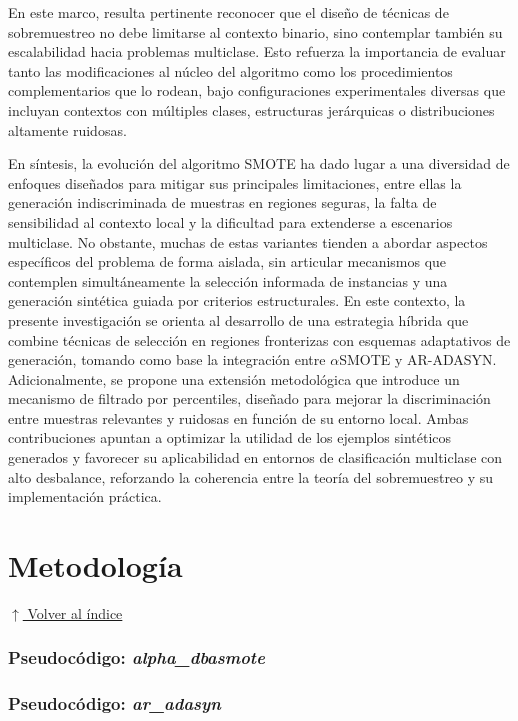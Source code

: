 \documentclass[12pt,a4paper]{article}
\begin{document}
En este marco, resulta pertinente reconocer que el diseño de técnicas de sobremuestreo no debe limitarse al contexto binario, sino contemplar también su escalabilidad hacia problemas multiclase. Esto refuerza la importancia de evaluar tanto las modificaciones al núcleo del algoritmo como los procedimientos complementarios que lo rodean, bajo configuraciones experimentales diversas que incluyan contextos con múltiples clases, estructuras jerárquicas o distribuciones altamente ruidosas.

En síntesis, la evolución del algoritmo SMOTE ha dado lugar a una diversidad de enfoques diseñados para mitigar sus principales limitaciones, entre ellas la generación indiscriminada de muestras en regiones seguras, la falta de sensibilidad al contexto local y la dificultad para extenderse a escenarios multiclase. No obstante, muchas de estas variantes tienden a abordar aspectos específicos del problema de forma aislada, sin articular mecanismos que contemplen simultáneamente la selección informada de instancias y una generación sintética guiada por criterios estructurales. En este contexto, la presente investigación se orienta al desarrollo de una estrategia híbrida que combine técnicas de selección en regiones fronterizas con esquemas adaptativos de generación, tomando como base la integración entre $ \alpha $SMOTE y AR-ADASYN. Adicionalmente, se propone una extensión metodológica que introduce un mecanismo de filtrado por percentiles, diseñado para mejorar la discriminación entre muestras relevantes y ruidosas en función de su entorno local. Ambas contribuciones apuntan a optimizar la utilidad de los ejemplos sintéticos generados y favorecer su aplicabilidad en entornos de clasificación multiclase con alto desbalance, reforzando la coherencia entre la teoría del sobremuestreo y su implementación práctica.

\section{Metodología} \noindent\hyperlink{toc}{\small$\uparrow$ Volver al índice}

\subsubsection{Pseudocódigo: \textit{alpha\_dbasmote}}


\subsubsection{Pseudocódigo: \textit{ar\_adasyn}}

\end{document}
